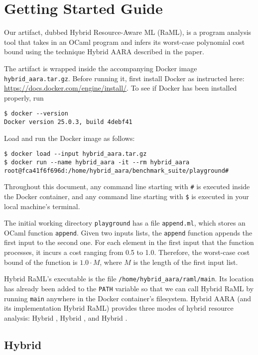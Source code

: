 
\section{Getting Started Guide}

Our artifact, dubbed Hybrid Resource-Aware ML (RaML), is a program analysis tool
that takes in an OCaml program and infers its worst-case polynomial cost bound
using the technique Hybrid AARA described in the paper.

The artifact is wrapped inside the accompanying Docker image
\texttt{hybrid\_aara.tar.gz}.
%
Before running it, first install Docker as instructed here:
\url{https://docs.docker.com/engine/install/}.
%
To see if Docker has been installed properly, run
\begin{verbatim}
$ docker --version
Docker version 25.0.3, build 4debf41
\end{verbatim}

Load and run the Docker image as follows:
\begin{verbatim}
$ docker load --input hybrid_aara.tar.gz
$ docker run --name hybrid_aara -it --rm hybrid_aara
root@fca41f6f696d:/home/hybrid_aara/benchmark_suite/playground#
\end{verbatim}
%
Throughout this document, any command line starting with \texttt{\#} is executed
inside the Docker container, and any command line starting with \texttt{\$} is
executed in your local machine's terminal.

The initial working directory \texttt{playground} has a file \texttt{append.ml},
which stores an OCaml function \texttt{append}.
%
Given two inputs lists, the \texttt{append} function appends the first input to
the second one.
%
For each element in the first input that the function processes, it incurs a
cost ranging from 0.5 to 1.0.
%
Therefore, the worst-case cost bound of the function is $1.0 \cdot M$, where $M$
is the length of the first input list.

Hybrid RaML's executable is the file \texttt{/home/hybrid\_aara/raml/main}.
%
Its location has already been added to the \texttt{PATH} variable so that we can
call Hybrid RaML by running \texttt{main} anywhere in the Docker container's
filesystem.
%
Hybrid AARA (and its implementation Hybrid RaML) provides three modes of hybrid
resource analysis: Hybrid \Opt{}, Hybrid \BayesWC{}, and Hybrid \BayesPC{}.

\subsection{Hybrid \Opt{}}

